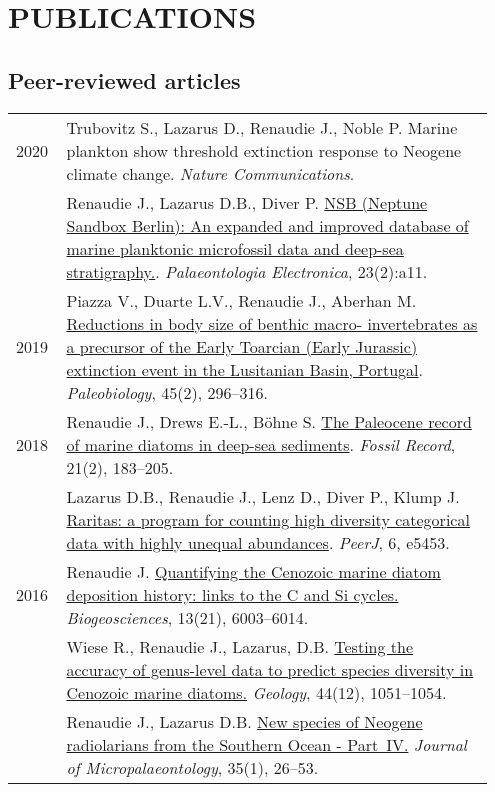 \documentclass[11pt, a4paper]{article}
\begin{document}
\section{PUBLICATIONS}
\subsection{Peer-reviewed articles}
\begin{longtable}{p{0.1\linewidth} P{0.85\linewidth}}
2020 & Trubovitz S., Lazarus D., Renaudie J., Noble P. Marine plankton show threshold extinction response to Neogene climate change. \textit{Nature Communications}.\\
 & Renaudie J., Lazarus D.B., Diver P. \href{https://palaeo-electronica.org/content/2020/2966-the-nsb-database}{NSB (Neptune Sandbox Berlin): An expanded and improved database of marine planktonic microfossil data and deep-sea stratigraphy.}. \textit{Palaeontologia Electronica}, 23(2):a11.\\
2019 & Piazza V., Duarte L.V., Renaudie J., Aberhan M. \href{http://doi.org/10.1017/pab.2019.11}{Reductions in body size of benthic macro- invertebrates as a precursor of the Early Toarcian (Early Jurassic) extinction event in the Lusitanian Basin, Portugal}. \textit{Paleobiology}, 45(2), 296--316.\\
2018 & Renaudie J., Drews E.-L., B\"{o}hne S. \href{http://dx.doi.org/10.5194/fr-21-183-2018}{The Paleocene record of marine diatoms in deep-sea sediments}. \textit{Fossil Record}, 21(2), 183--205.\\
 & Lazarus D.B., Renaudie J., Lenz D., Diver P., Klump J. \href{http://dx.doi.org/10.7717/peerj.5453}{Raritas: a program for counting high diversity categorical data with highly unequal abundances}. \textit{PeerJ}, 6, e5453.\\
2016 & Renaudie J. \href{http://dx.doi.org/10.5194/bg-13-6003-2016}{Quantifying the Cenozoic marine diatom deposition history: links to the C and Si cycles.} \textit{Biogeosciences}, 13(21), 6003--6014.\\
 & Wiese R., Renaudie J., Lazarus, D.B. \href{http://dx.doi.org/10.1130/G38347.1}{Testing the accuracy of genus-level data to predict species diversity in Cenozoic marine diatoms.} \textit{Geology}, 44(12), 1051--1054.\\
 & Renaudie J., Lazarus D.B. \href{http://dx.doi.org/10.1144/jmpaleo2014-026}{New species of Neogene radiolarians from the Southern Ocean - Part IV.} \textit{Journal of Micropalaeontology}, 35(1), 26--53.\\

\end{longtable}
\end{document}
